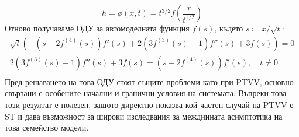 \begin{equation*}
    h = \phi (x,t) = {t^{3/2}}f\left( {\frac{{{x}}}{{{t^{1/2}}}}} \right)
\end{equation*}
Отново получаваме ОДУ за автомоделната функция $f(s)$, където $s \coloneqq x/\sqrt{t}$:
\begin{align*}
    \sqrt t \left( { - \left( {s - 2{f^{(4)}}(s)} \right)f'(s) + 2\left( {3{f^{(3)}}(s) - 1} \right)f''(s) + 3f(s)} \right) = 0 \\
     2\left( {3{f^{(3)}}(s) - 1} \right)f''(s) + 3f(s) = \left( {s - 2{f^{(4)}}(s)} \right)f'(s), \quad t \ne 0 \\
\end{align*}
Пред решаването на това ОДУ стоят същите проблеми като при PTVV, основно свързани с особените начални и гранични условия на системата. Въпреки това този резултат е полезен, защото директно показва кой частен случай на PTVV е ST и дава възможност за широки изследвания за междинната асимптотика на това семейство модели.
